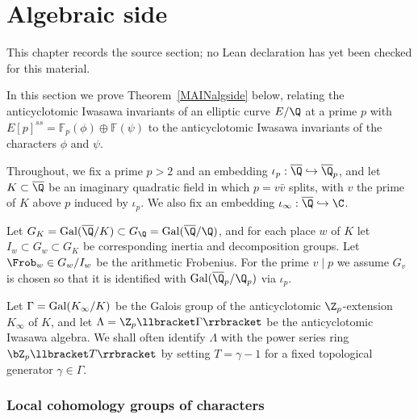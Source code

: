 \chapter{Algebraic side}
\label{anticyclotomic-iwasawa-rational-elliptic-eisenstein-chapter-02}

\begin{remark}
\label{anticyclotomic-iwasawa-rational-elliptic-eisenstein-chapter-02-source}
This chapter records the source section; no Lean declaration has yet been checked for this material.
\notready
\end{remark}

\label{sec:algebraic}

In this section we prove Theorem~\ref{MAINalgside} below, relating the anticyclotomic Iwasawa invariants of an elliptic curve $E/\Q$ at a prime $p$ with $E[p]^{ss}=\mathbb{F}_p(\phi)\oplus\mathbb{F}(\psi)$ to the anticyclotomic Iwasawa invariants of the characters $\phi$ and $\psi$.

Throughout, we fix a prime $p>2$ and an embedding $\iota_p:\overline{\Q}\hookrightarrow\overline{\Q}_p$, and let $K\subset\overline{\Q}$ be an imaginary quadratic field in which $p=v\bar{v}$ splits, with $v$ the prime of $K$ above $p$ induced by $\iota_p$.  We also fix an embedding $\iota_\infty:\overline{\Q}\hookrightarrow \C$.

Let $G_K = {\rm Gal}(\overline{\Q}/K)\subset G_\Q = {\rm Gal}(\overline{\Q}/\Q)$, and for each place $w$ of $K$ let $I_w\subset G_w\subset G_K$ be
corresponding inertia and decomposition groups. Let $\Frob_w\in G_w/I_w$ be the arithmetic Frobenius. For the prime $v\mid p$ we assume
$G_v$ is chosen so that it is identified with ${\rm Gal}(\overline{\Q}_p/\Q_p)$ via $\iota_p$.

Let $\Gamma={\rm Gal}(K_\infty/K)$ be the Galois group of the anticyclotomic $\Z_p$-extension $K_\infty$ of $K$, and
let $\Lambda=\Z_p\llbracket\Gamma\rrbracket$ be the anticyclotomic Iwasawa algebra. We shall often identify $\Lambda$ with the power series ring $\bZ_p\llbracket T\rrbracket$ by setting $T=\gamma-1$ for a fixed topological generator $\gamma\in\Gamma$.


\subsection{Local cohomology groups of characters}\label{localchar}



